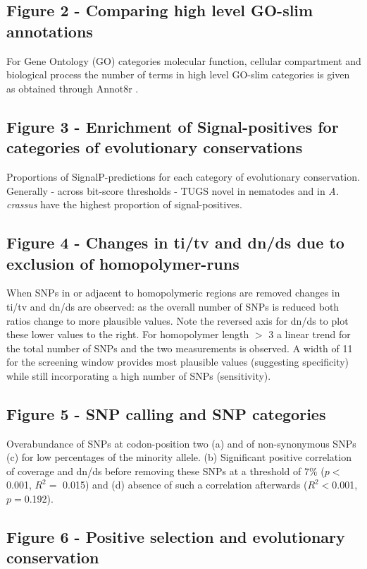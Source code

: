 \documentclass[10pt]{bmc_article}
\newenvironment{bmcformat}{\begin{raggedright}\baselineskip20pt\sloppy\setboolean{publ}{false}}{\end{raggedright}\baselineskip20pt\sloppy}
\begin{document}
\begin{bmcformat}
\subsection*{Figure 2 - Comparing high level GO-slim annotations}

For Gene Ontology (GO) categories molecular function, cellular
compartment and biological process the number of terms in high level
GO-slim categories is given as obtained through Annot8r
\cite{schmid_annot8r:_2008}.

\subsection*{Figure 3 - Enrichment of Signal-positives for categories
  of evolutionary conservations}

Proportions of SignalP-predictions for each category of evolutionary
conservation. Generally - across bit-score thresholds - TUGS novel in
nematodes and in \textit{A. crassus} have the highest proportion of
signal-positives.


\subsection*{Figure 4 - Changes in ti/tv and dn/ds due to exclusion of
  homopolymer-runs}

When SNPs in or adjacent to homopolymeric regions are removed changes
in ti/tv and dn/ds are observed: as the overall number of SNPs is
reduced both ratios change to more plausible values. Note the reversed
axis for dn/ds to plot these lower values to the right. For
homopolymer length $>$ 3 a linear trend for the total number of SNPs
and the two measurements is observed. A width of 11 for the screening
window provides most plausible values (suggesting specificity) while
still incorporating a high number of SNPs (sensitivity).

\subsection*{Figure 5 - SNP calling and SNP categories}
 
Overabundance of SNPs at codon-position two (a) and of non-synonymous
SNPs (c) for low percentages of the minority allele. (b) Significant
positive correlation of coverage and dn/ds before removing these SNPs
at a threshold of 7\% ($p<$ 0.001, $R^2=$
0.015) and (d) absence of such a
correlation afterwards ($R^2<$0.001,
$p=$0.192).


\subsection*{Figure 6 - Positive selection and evolutionary
  conservation}


\end{bmcformat}
\end{document}
